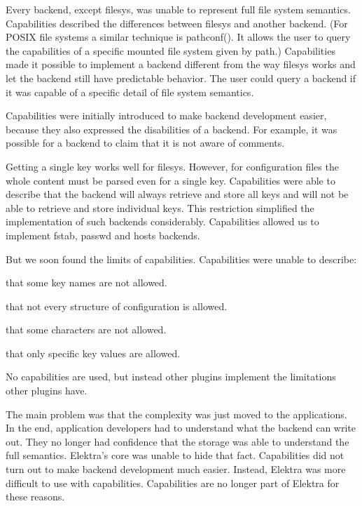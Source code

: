 Every backend, except {\ttfamily filesys}, was unable to represent full file system semantics. Capabilities described the differences between {\ttfamily filesys} and another backend. (For P\+O\+S\+IX file systems a similar technique is {\ttfamily pathconf()}. It allows the user to query the capabilities of a specific mounted file system given by path.) Capabilities made it possible to implement a backend different from the way {\ttfamily filesys} works and let the backend still have predictable behavior. The user could query a backend if it was capable of a specific detail of file system semantics.

Capabilities were initially introduced to make backend development easier, because they also expressed the disabilities of a backend. For example, it was possible for a backend to claim that it is not aware of comments.

Getting a single key works well for {\ttfamily filesys}. However, for configuration files the whole content must be parsed even for a single key. Capabilities were able to describe that the backend will always retrieve and store all keys and will not be able to retrieve and store individual keys. This restriction simplified the implementation of such backends considerably. Capabilities allowed us to implement fstab, passwd and hosts backends.

But we soon found the limits of capabilities. Capabilities were unable to describe\+:


\begin{DoxyItemize}
\item that some key names are not allowed.
\item that not every structure of configuration is allowed.
\item that some characters are not allowed.
\item that only specific key values are allowed.
\end{DoxyItemize}

No capabilities are used, but instead other plugins implement the limitations other plugins have.

The main problem was that the complexity was just moved to the applications. In the end, application developers had to understand what the backend can write out. They no longer had confidence that the storage was able to understand the full semantics. Elektra’s core was unable to hide that fact. Capabilities did not turn out to make backend development much easier. Instead, Elektra was more difficult to use with capabilities. Capabilities are no longer part of Elektra for these reasons.